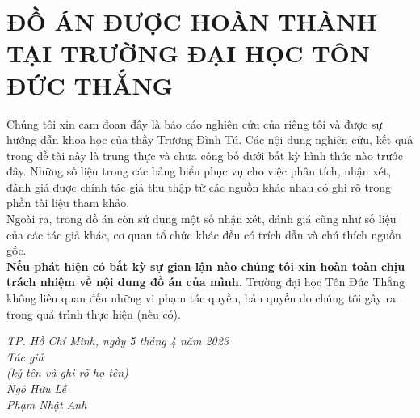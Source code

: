 \documentclass[12pt,a4paper]{report}
\begin{document}
\section*{ĐỒ ÁN ĐƯỢC HOÀN THÀNH\\
TẠI TRƯỜNG ĐẠI HỌC TÔN ĐỨC THẮNG}
\thispagestyle{empty}
\hspace*{0.25cm}Chúng tôi xin cam đoan đây là báo cáo nghiên cứu của riêng tôi và được sự hướng dẫn khoa học của thầy Trương Đình Tú. Các nội dung nghiên cứu, kết quả trong đề tài này là trung thực và chưa công bố dưới bất kỳ hình thức nào trước đây. Những số liệu trong các bảng biểu phục vụ cho việc phân tích, nhận xét, đánh giá được chính tác giả thu thập từ các nguồn khác nhau có ghi rõ trong phần tài liệu tham khảo.\\
\hspace*{1cm}Ngoài ra, trong đồ án còn sử dụng một số nhận xét, đánh giá cũng như số liệu của các tác giả khác, cơ quan tổ chức khác đều có trích dẫn và chú thích nguồn gốc.\\
\textbf{\hspace*{1cm}Nếu phát hiện có bất kỳ sự gian lận nào chúng tôi xin hoàn toàn chịu trách nhiệm về nội dung đồ án của mình.} Trường đại học Tôn Đức Thắng không liên quan đến những vi phạm tác quyền, bản quyền do chúng tôi gây ra trong quá trình thực hiện (nếu có).
\begin{flushright}
\textit{TP. Hồ Chí Minh, ngày 5 tháng 4 năm 2023}\\[0.25cm]   
\textit{Tác giả \hspace*{3.5cm}}      \\[0.25cm]
	\textit{(ký tên và ghi rõ họ tên)\hspace*{2cm}} \\[2cm]
	\textit{Ngô Hữu Lễ\hspace*{3.cm}} \\[2cm]
	\textit{Phạm Nhật Anh\hspace*{2.5cm}} \\[0.5cm]
\end{flushright}
\cleardoublepage


\vspace*{1cm}
\tableofcontents %
\thispagestyle{empty}
\cleardoublepage


\end{document}
